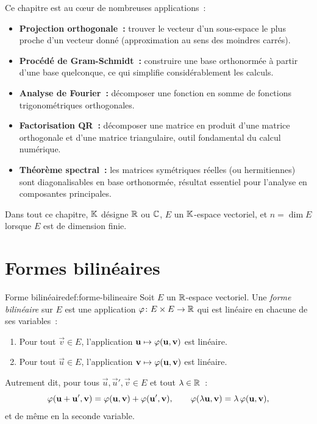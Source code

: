 Ce chapitre est au c\oe ur de nombreuses applications~:
\begin{itemize}
  \item \textbf{Projection orthogonale~:}
    trouver le vecteur d'un sous-espace le plus proche d'un vecteur donné
    (approximation au sens des moindres carrés).
  \item \textbf{Procédé de Gram-Schmidt~:}
    construire une base orthonormée à partir d'une base quelconque, ce qui
    simplifie considérablement les calculs.
  \item \textbf{Analyse de Fourier~:}
    décomposer une fonction en somme de fonctions trigonométriques
    orthogonales.
  \item \textbf{Factorisation QR~:}
    décomposer une matrice en produit d'une matrice orthogonale et
    d'une matrice triangulaire, outil fondamental du calcul numérique.
  \item \textbf{Théorème spectral~:}
    les matrices symétriques réelles (ou hermitiennes) sont
    diagonalisables en base orthonormée, résultat essentiel pour
    l'analyse en composantes principales.
\end{itemize}

\medskip

Dans tout ce chapitre, ${\mathbb{K}}$ désigne ${\mathbb{R}}$ ou ${\mathbb{C}}$, $E$ un ${\mathbb{K}}$-espace
vectoriel, et $n=\dim E$ lorsque $E$ est de dimension finie.

\section{Formes bilinéaires}\label{sec:formes-bilineaires}

\begin{definition}{Forme bilinéaire}{def:forme-bilineaire}
  Soit $E$ un ${\mathbb{R}}$-espace vectoriel. Une \emph{forme bilinéaire} sur $E$
  est une application $\varphi\colon E\times E\to{\mathbb{R}}$ qui est linéaire en
  chacune de ses variables~:
  \begin{enumerate}[label=(\roman*)]
    \item Pour tout $\vec{v}\in E$, l'application
      $\mathbf{u}\mapsto\varphi(\mathbf{u},\mathbf{v})$ est linéaire.
    \item Pour tout $\vec{u}\in E$, l'application
      $\mathbf{v}\mapsto\varphi(\mathbf{u},\mathbf{v})$ est linéaire.
  \end{enumerate}
  Autrement dit, pour tous $\vec{u},\vec{u}',\vec{v}\in E$ et tout
  $\lambda\in{\mathbb{R}}$~:
  \[
    \varphi(\mathbf{u}+\mathbf{u}',\mathbf{v})=\varphi(\mathbf{u},\mathbf{v})
    +\varphi(\mathbf{u}',\mathbf{v}),\qquad
    \varphi(\lambda\mathbf{u},\mathbf{v})=\lambda\,\varphi(\mathbf{u},\mathbf{v}),
  \]
  et de même en la seconde variable.
\end{definition}

